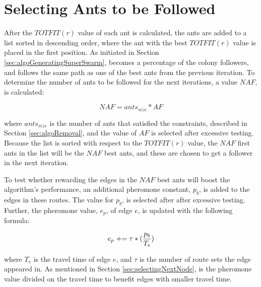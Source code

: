 \section{Selecting Ants to be Followed}
\label{sec:selctingAntsToBeFollowed}

After the $TOTFIT(r)$ value of each ant is calculated, the ants are added to a list sorted in descending order, where the ant with the best $TOTFIT(r)$ value is placed in the first position. As initiated in Section \vref{sec:algoGeneratingSuperSwarm}, becomes a percentage of the colony followers, and follows the same path as one of the best ants from the previous iteration. To determine the number of ants to be followed for the next iterations, a value $NAF$, is calculated:

$$NAF = ants_{size} * AF$$
 
where $ants_{size}$ is the number of ants that satisfied the constraints, described in Section \vref{sec:algoRemoval}, and the value of $AF$ is selected after excessive testing. Because the list is sorted with respect to the $TOTFIT(r)$ value, the $NAF$ first ants in the list will be the $NAF$ best ants, and these are chosen to get a follower in the next iteration. %

To test whether rewarding the edges in the $NAF$ best ants will boost the algorithm's performance, an additional pheromone constant, $p_b$, is added to the edges in these routes. The value for $p_b$, is selected after after excessive testing. Further, the pheromone value, $e_p$, of edge $e$, is updated with the following formula:

$$e_p \mathrel{+}= \tau*(\frac{p_b}{T_e})$$ 

where $T_e$ is the travel time of edge $e$, and $\tau$ is the number of route sets the edge appeared in. As mentioned in Section \vref{sec:selectingNextNode}, is the pheromone value divided on the travel time to benefit edges with smaller travel time.


 